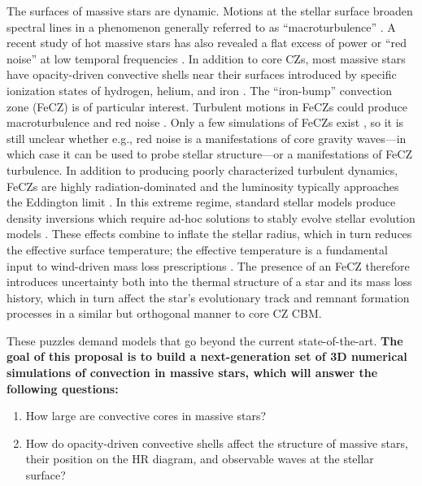 \documentclass[12pt]{article} %
\begin{document}
The surfaces of massive stars are dynamic.
Motions at the stellar surface broaden spectral lines in a phenomenon generally referred to as ``macroturbulence'' \citep{schultz_etal_2022b}.
A recent study of hot massive stars has also revealed a flat excess of power or ``red noise'' at low temporal frequencies \citep[see Fig.~\ref{fig:intro}, right;][]{bowman_etal_2019}.
In addition to core CZs, most massive stars have opacity-driven convective shells near their surfaces introduced by specific ionization states of hydrogen, helium, and iron \citep[see Fig.~\ref{fig:intro}, left;][]{cantiello_etal_2009}.
The ``iron-bump'' convection zone (FeCZ) is of particular interest.
Turbulent motions in FeCZs could produce macroturbulence and red noise \citep{cantiello_etal_2021, schultz_etal_2022, schultz_etal_2022b}.
Only a few simulations of FeCZs exist \citep{jiang_etal_2015}, so it is still unclear whether e.g., red noise is a manifestations of core gravity waves---in which case it can be used to probe stellar structure---or a manifestations of FeCZ turbulence.
In addition to producing poorly characterized turbulent dynamics, FeCZs are highly radiation-dominated and the luminosity typically approaches the Eddington limit \citep{jermyn_etal_2022_atlas}.
In this extreme regime, standard stellar models produce density inversions which require ad-hoc solutions to stably evolve stellar evolution models \citep{kohler_etal_2015}.
These effects combine to inflate the stellar radius, which in turn reduces the effective surface temperature; the effective temperature is a fundamental input to wind-driven mass loss prescriptions \citep{yusof_etal_2013}.
The presence of an FeCZ therefore introduces uncertainty both into the thermal structure of a star and its mass loss history, which in turn affect the star's evolutionary track and remnant formation processes in a similar but orthogonal manner to core CZ CBM.

These puzzles demand models that go beyond the current state-of-the-art.
\textbf{The goal of this proposal is to build a next-generation set of 3D numerical simulations of convection in massive stars, which will answer the following questions:}
\begin{enumerate}
    \item How large are convective cores in massive stars?
    \item How do opacity-driven convective shells affect the structure of massive stars, their position on the HR diagram, and observable waves at the stellar surface?
\end{enumerate}
\end{document}
